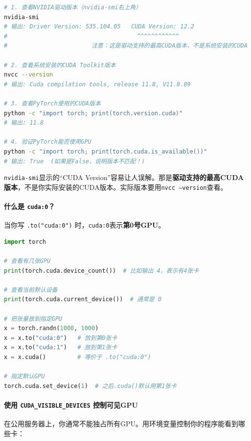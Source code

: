 \begin{lstlisting}[language=bash, caption=查看各种CUDA相关版本]
# 1. 查看NVIDIA驱动版本（nvidia-smi右上角）
nvidia-smi
# 输出: Driver Version: 535.104.05   CUDA Version: 12.2
#                                     ^^^^^^^^^^^^
#                        注意：这是驱动支持的最高CUDA版本，不是系统安装的CUDA

# 2. 查看系统安装的CUDA Toolkit版本
nvcc --version
# 输出: Cuda compilation tools, release 11.8, V11.8.89

# 3. 查看PyTorch使用的CUDA版本
python -c "import torch; print(torch.version.cuda)"
# 输出: 11.8

# 4. 验证PyTorch能否使用GPU
python -c "import torch; print(torch.cuda.is_available())"
# 输出: True  (如果是False，说明版本不匹配！)
\end{lstlisting}

\begin{remark}
\texttt{nvidia-smi}显示的“CUDA Version”容易让人误解。那是\textbf{驱动支持的最高CUDA版本}，不是你实际安装的CUDA版本。实际版本要用\texttt{nvcc --version}查看。
\end{remark}

\paragraph{什么是 \texttt{cuda:0}？}

当你写 \texttt{.to("cuda:0")} 时，\texttt{cuda:0}表示\textbf{第0号GPU}。

\begin{lstlisting}[language=Python, caption=GPU设备管理]
import torch

# 查看有几张GPU
print(torch.cuda.device_count())  # 比如输出 4，表示有4张卡

# 查看当前默认设备
print(torch.cuda.current_device())  # 通常是 0

# 把张量放到指定GPU
x = torch.randn(1000, 1000)
x = x.to("cuda:0")   # 放到第0张卡
x = x.to("cuda:1")   # 放到第1张卡
x = x.cuda()         # 等价于 .to("cuda:0")

# 指定默认GPU
torch.cuda.set_device(1)  # 之后.cuda()默认用第1张卡
\end{lstlisting}

\paragraph{使用 \texttt{CUDA\_VISIBLE\_DEVICES} 控制可见GPU}

在公用服务器上，你通常不能独占所有GPU。用环境变量控制你的程序能看到哪些卡：

